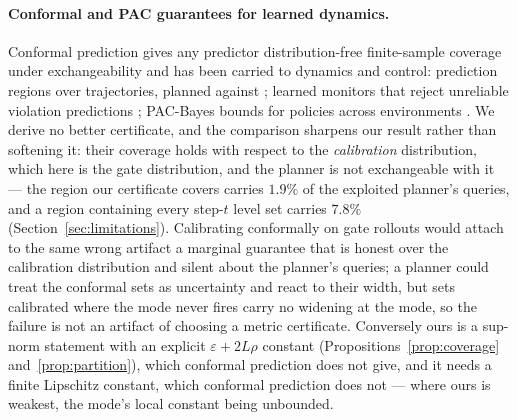 \paragraph{Conformal and PAC guarantees for learned dynamics.} Conformal prediction gives any predictor distribution-free finite-sample coverage under exchangeability \citep{vovk2022alrw} and has been carried to dynamics and control: prediction regions over trajectories, planned against \citep{lindemann2023conformal}; learned monitors that reject unreliable violation predictions \citep{bortolussi2019npm}; PAC-Bayes bounds for policies across environments \citep{majumdar2021pacbayes}. We derive no better certificate, and the comparison sharpens our result rather than softening it: their coverage holds with respect to the \emph{calibration} distribution, which here is the gate distribution, and the planner is not exchangeable with it --- the region our certificate covers carries $1.9\%$ of the exploited planner's queries, and a region containing every step-$t$ level set carries $7.8\%$ (Section~\ref{sec:limitations}). Calibrating conformally on gate rollouts would attach to the same wrong artifact a marginal guarantee that is honest over the calibration distribution and silent about the planner's queries; a planner could treat the conformal sets as uncertainty and react to their width, but sets calibrated where the mode never fires carry no widening at the mode, so the failure is not an artifact of choosing a metric certificate. Conversely ours is a sup-norm statement with an explicit $\varepsilon + 2L\rho$ constant (Propositions~\ref{prop:coverage} and~\ref{prop:partition}), which conformal prediction does not give, and it needs a finite Lipschitz constant, which conformal prediction does not --- where ours is weakest, the mode's local constant being unbounded.

